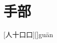 \chapter{手部}

\begin{Lemma} %
	[人十口口][]{gu\=an}{}
	\pro{}\lipsum
	\begin{mainenum}
		\mitem  \en{}
		\E{\e \e \e }
		\mitem  \en{}
		\E{\e \e \e }
		\mitem  \en{}
		\E{\e \e \e }
	\end{mainenum}
\end{Lemma}







